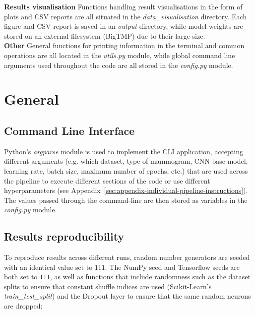 \textbf{Results visualisation} \space Functions handling result visualisations in the form of plots and CSV reports are all situated in the \textit{data\_visualisation} directory. Each figure and CSV report is saved in an \textit{output} directory, while model weights are stored on an external filesystem (BigTMP) due to their large size.\\

\textbf{Other} \space General functions for printing information in the terminal and common operations are all located in the \textit{utils.py} module, while global command line arguments used throughout the code are all stored in the \textit{config.py} module.


\section{General}

\subsection{Command Line Interface}

Python's \textit{argparse} module is used to implement the CLI application, accepting different arguments (e.g. which dataset,  type of mammogram, CNN base model, learning rate, batch size, maximum number of epochs, etc.) that are used across the pipeline to execute different sections of the code or use different hyperparameters (see Appendix~\ref{sec:appendix-individual-pipeline-instructions}). The values passed through the command-line are then stored as variables in the \textit{config.py} module.

\subsection{Results reproducibility}

To reproduce results across different runs, random number generators are seeded with an identical value set to $111$. The NumPy seed and Tensorflow seeds are both set to $111$, as well as functions that include randomness such as the dataset splits to ensure that constant shuffle indices are used (Scikit-Learn's \textit{train\_test\_split}) and the Dropout layer to ensure that the same random neurons are dropped:

